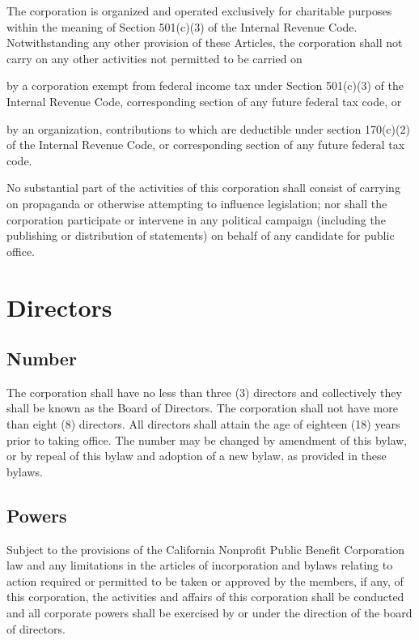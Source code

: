\documentclass{article}
\begin{document}
	The corporation is organized and operated exclusively for charitable purposes within the meaning of Section 501(c)(3) of the Internal Revenue Code. Notwithstanding any other provision of these Articles, the corporation shall not carry on any other activities not permitted to be carried on 
	\begin{inparaenum}[\itshape 1\upshape)]
		\item by a corporation exempt from federal income tax under Section 501(c)(3) of the Internal Revenue Code, corresponding section of any future federal tax code, or 
		\item by an organization, contributions to which are deductible under section 170(c)(2) of the Internal Revenue Code, or corresponding section of any future federal tax code.
	\end{inparaenum}
	
	No substantial part of the activities of this corporation shall consist of carrying on propaganda or otherwise attempting to influence legislation; nor shall the corporation participate or intervene in any political campaign (including the publishing or distribution of statements) on behalf of any candidate for public office.
	
	\section{Directors}
	\subsection{Number}
	The corporation shall have no less than three (3) directors and collectively they shall be known as the Board of Directors. The corporation shall not have more than eight (8) directors. All directors shall attain the age of eighteen (18) years prior to taking office. The number may be changed by amendment of this bylaw, or by repeal of this bylaw and adoption of a new bylaw, as provided in these bylaws.
	
	\subsection{Powers}
	Subject to the provisions of the California Nonprofit Public Benefit Corporation law and any limitations in the articles of incorporation and bylaws relating to action required or permitted to be taken or approved by the members, if any, of this corporation, the activities and affairs of this corporation shall be conducted and all corporate powers shall be exercised by or under the direction of the board of directors.
	
\end{document}

